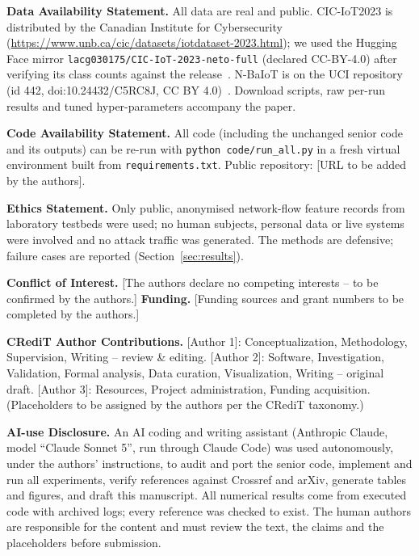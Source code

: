 \noindent\textbf{Data Availability Statement.} All data are real and public. CIC-IoT2023 is distributed by the Canadian Institute for Cybersecurity (\url{https://www.unb.ca/cic/datasets/iotdataset-2023.html}); we used the Hugging Face mirror \texttt{lacg030175/CIC-IoT-2023-neto-full} (declared CC-BY-4.0) after verifying its class counts against the release~\cite{neto2023}. N-BaIoT is on the UCI repository (id 442, doi:10.24432/C5RC8J, CC BY 4.0)~\cite{meidan2018}. Download scripts, raw per-run results and tuned hyper-parameters accompany the paper.

\noindent\textbf{Code Availability Statement.} All code (including the unchanged senior code and its outputs) can be re-run with \texttt{python code/run\_all.py} in a fresh virtual environment built from \texttt{requirements.txt}. Public repository: [URL to be added by the authors].

\noindent\textbf{Ethics Statement.} Only public, anonymised network-flow feature records from laboratory testbeds were used; no human subjects, personal data or live systems were involved and no attack traffic was generated. The methods are defensive; failure cases are reported (Section~\ref{sec:results}).

\noindent\textbf{Conflict of Interest.} [The authors declare no competing interests -- to be confirmed by the authors.] \textbf{Funding.} [Funding sources and grant numbers to be completed by the authors.]

\noindent\textbf{CRediT Author Contributions.} [Author 1]: Conceptualization, Methodology, Supervision, Writing -- review \& editing. [Author 2]: Software, Investigation, Validation, Formal analysis, Data curation, Visualization, Writing -- original draft. [Author 3]: Resources, Project administration, Funding acquisition. (Placeholders to be assigned by the authors per the CRediT taxonomy.)

\noindent\textbf{AI-use Disclosure.} An AI coding and writing assistant (Anthropic Claude, model ``Claude Sonnet 5'', run through Claude Code) was used autonomously, under the authors' instructions, to audit and port the senior code, implement and run all experiments, verify references against Crossref and arXiv, generate tables and figures, and draft this manuscript. All numerical results come from executed code with archived logs; every reference was checked to exist. The human authors are responsible for the content and must review the text, the claims and the placeholders before submission.
